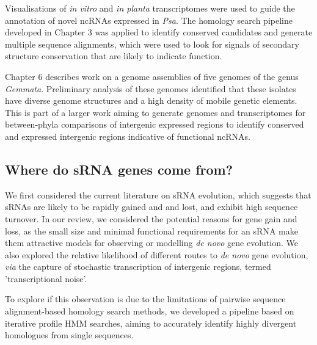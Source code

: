 Visualisations of \textit{in vitro} and \textit{in planta} transcriptomes were used to guide the annotation of novel ncRNAs expressed in \textit{Psa}. The homology search pipeline developed in Chapter 3 was applied to identify conserved candidates and generate multiple sequence alignments, which were used to look for signals of secondary structure conservation that are likely to indicate function.

Chapter 6 describes work on a genome assemblies of five genomes of the genus \textit{Gemmata}. Preliminary analysis of these genomes identified that these isolates have diverse genome structures and a high density of mobile genetic elements. This is part of a larger work aiming to generate genomes and transcriptomes for between-phyla comparisons of intergenic expressed regions to identify conserved and expressed intergenic regions indicative of functional ncRNAs.
\subsection{Where do sRNA genes come from?}

We first considered the current literature on sRNA evolution, which suggests that sRNAs are likely to be rapidly gained and and lost, and exhibit high sequence turnover. In our review, we considered the potential reasons for gene gain and loss, as the small size and minimal functional requirements for an sRNA make them attractive models for observing or modelling \textit{de novo} gene evolution. We also explored the relative likelihood of different routes to \textit{de novo} gene evolution, \textit{via} the capture of stochastic transcription of intergenic regions, termed 'transcriptional noise'.

To explore if this observation is due to the limitations of pairwise sequence alignment-based homology search methods, we developed a pipeline based on iterative profile HMM searches, aiming to accurately identify highly divergent homologues from single sequences.

